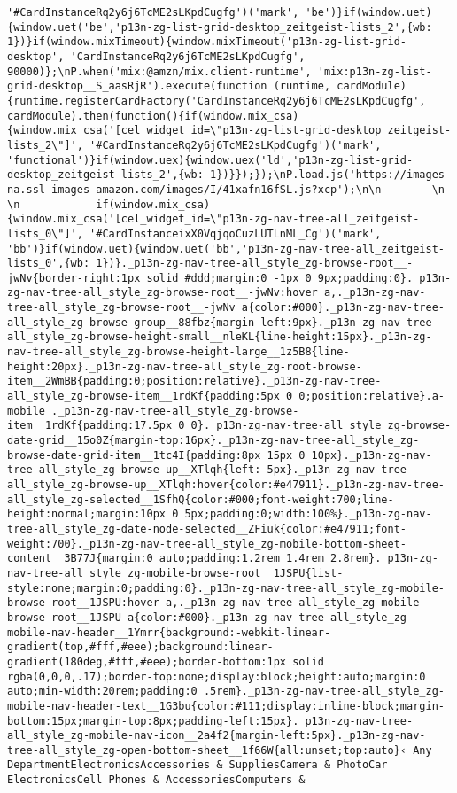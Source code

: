 \documentclass[
]{article}
\begin{document}
\begin{verbatim}
'#CardInstanceRq2y6j6TcME2sLKpdCugfg')('mark', 'be')}if(window.uet){window.uet('be','p13n-zg-list-grid-desktop_zeitgeist-lists_2',{wb: 1})}if(window.mixTimeout){window.mixTimeout('p13n-zg-list-grid-desktop', 'CardInstanceRq2y6j6TcME2sLKpdCugfg', 90000)};\nP.when('mix:@amzn/mix.client-runtime', 'mix:p13n-zg-list-grid-desktop__S_aasRjR').execute(function (runtime, cardModule) {runtime.registerCardFactory('CardInstanceRq2y6j6TcME2sLKpdCugfg', cardModule).then(function(){if(window.mix_csa){window.mix_csa('[cel_widget_id=\"p13n-zg-list-grid-desktop_zeitgeist-lists_2\"]', '#CardInstanceRq2y6j6TcME2sLKpdCugfg')('mark', 'functional')}if(window.uex){window.uex('ld','p13n-zg-list-grid-desktop_zeitgeist-lists_2',{wb: 1})}});});\nP.load.js('https://images-na.ssl-images-amazon.com/images/I/41xafn16fSL.js?xcp');\n\n        \n        \n            if(window.mix_csa){window.mix_csa('[cel_widget_id=\"p13n-zg-nav-tree-all_zeitgeist-lists_0\"]', '#CardInstanceixX0VqjqoCuzLUTLnML_Cg')('mark', 'bb')}if(window.uet){window.uet('bb','p13n-zg-nav-tree-all_zeitgeist-lists_0',{wb: 1})}._p13n-zg-nav-tree-all_style_zg-browse-root__-jwNv{border-right:1px solid #ddd;margin:0 -1px 0 9px;padding:0}._p13n-zg-nav-tree-all_style_zg-browse-root__-jwNv:hover a,._p13n-zg-nav-tree-all_style_zg-browse-root__-jwNv a{color:#000}._p13n-zg-nav-tree-all_style_zg-browse-group__88fbz{margin-left:9px}._p13n-zg-nav-tree-all_style_zg-browse-height-small__nleKL{line-height:15px}._p13n-zg-nav-tree-all_style_zg-browse-height-large__1z5B8{line-height:20px}._p13n-zg-nav-tree-all_style_zg-root-browse-item__2WmBB{padding:0;position:relative}._p13n-zg-nav-tree-all_style_zg-browse-item__1rdKf{padding:5px 0 0;position:relative}.a-mobile ._p13n-zg-nav-tree-all_style_zg-browse-item__1rdKf{padding:17.5px 0 0}._p13n-zg-nav-tree-all_style_zg-browse-date-grid__15o0Z{margin-top:16px}._p13n-zg-nav-tree-all_style_zg-browse-date-grid-item__1tc4I{padding:8px 15px 0 10px}._p13n-zg-nav-tree-all_style_zg-browse-up__XTlqh{left:-5px}._p13n-zg-nav-tree-all_style_zg-browse-up__XTlqh:hover{color:#e47911}._p13n-zg-nav-tree-all_style_zg-selected__1SfhQ{color:#000;font-weight:700;line-height:normal;margin:10px 0 5px;padding:0;width:100%}._p13n-zg-nav-tree-all_style_zg-date-node-selected__ZFiuk{color:#e47911;font-weight:700}._p13n-zg-nav-tree-all_style_zg-mobile-bottom-sheet-content__3B77J{margin:0 auto;padding:1.2rem 1.4rem 2.8rem}._p13n-zg-nav-tree-all_style_zg-mobile-browse-root__1JSPU{list-style:none;margin:0;padding:0}._p13n-zg-nav-tree-all_style_zg-mobile-browse-root__1JSPU:hover a,._p13n-zg-nav-tree-all_style_zg-mobile-browse-root__1JSPU a{color:#000}._p13n-zg-nav-tree-all_style_zg-mobile-nav-header__1Ymrr{background:-webkit-linear-gradient(top,#fff,#eee);background:linear-gradient(180deg,#fff,#eee);border-bottom:1px solid rgba(0,0,0,.17);border-top:none;display:block;height:auto;margin:0 auto;min-width:20rem;padding:0 .5rem}._p13n-zg-nav-tree-all_style_zg-mobile-nav-header-text__1G3bu{color:#111;display:inline-block;margin-bottom:15px;margin-top:8px;padding-left:15px}._p13n-zg-nav-tree-all_style_zg-mobile-nav-icon__2a4f2{margin-left:5px}._p13n-zg-nav-tree-all_style_zg-open-bottom-sheet__1f66W{all:unset;top:auto}‹ Any DepartmentElectronicsAccessories & SuppliesCamera & PhotoCar ElectronicsCell Phones & AccessoriesComputers & 
\end{verbatim}
\end{document}

